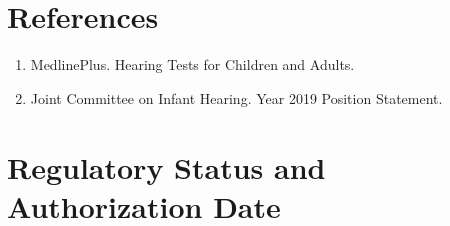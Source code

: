 \section*{References}
\begin{enumerate}
  \item MedlinePlus. Hearing Tests for Children and Adults.
  \item Joint Committee on Infant Hearing. Year 2019 Position Statement.
\end{enumerate}

\clearpage


\section*{Regulatory Status and Authorization Date}

\clearpage
